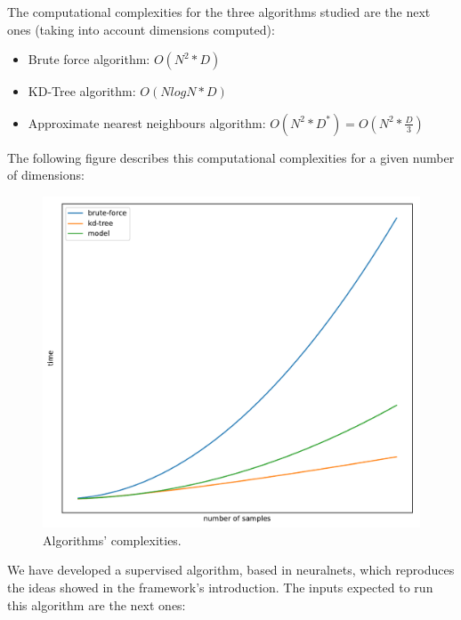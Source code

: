 \documentclass[a4paper,11pt,spanish]{report}
\begin{document}
The computational complexities for the three algorithms studied are the next ones (taking into account dimensions computed):
\begin{itemize}
\item Brute force algorithm: $ O(N^{2}*D)$ 
\item KD-Tree algorithm: $ O(NlogN*D)$ 
\item Approximate nearest neighbours algorithm: $ O(N^{2}*D^{*}) = O(N^{2}*\frac{D}{3})$ 
\end{itemize}

The following figure describes this computational complexities for a given number of dimensions:

\begin{figure}[h]
\centering
\includegraphics[width=12cm]{figures/complexities.pdf}
\caption{\label{figurecomplexities}Algorithms' complexities.}
\end{figure}


\newpage

We have developed a supervised algorithm, based in neuralnets, which reproduces the ideas showed in the framework's introduction.
The inputs expected to run this algorithm are the next ones:
\end{document}
